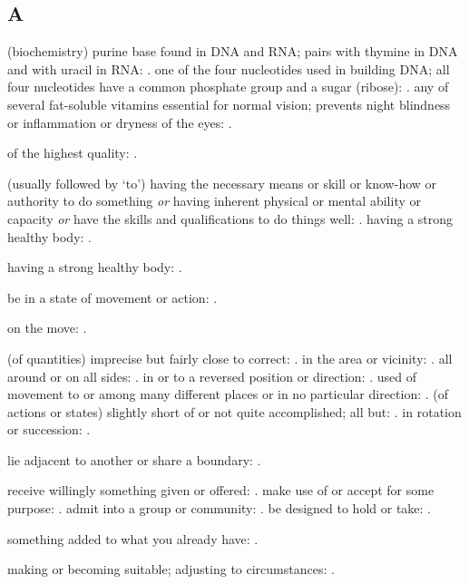 \subsection*{A}

  (biochemistry) purine base found in DNA and RNA; pairs with thymine in DNA and with uracil in RNA: . one of the four nucleotides used in building DNA; all four nucleotides have a common phosphate group and a sugar (ribose): . any of several fat-soluble vitamins essential for normal vision; prevents night blindness or inflammation or dryness of the eyes: .

  of the highest quality: .

  (usually followed by `to') having the necessary means or skill or know-how or authority to do something \textit{or} having inherent physical or mental ability or capacity \textit{or} have the skills and qualifications to do things well: . having a strong healthy body: .

  having a strong healthy body: .

  be in a state of movement or action: .

  on the move: .

  (of quantities) imprecise but fairly close to correct: . in the area or vicinity: . all around or on all sides: . in or to a reversed position or direction: . used of movement to or among many different places or in no particular direction: . (of actions or states) slightly short of or not quite accomplished; all but: . in rotation or succession: .

  lie adjacent to another or share a boundary: .

  receive willingly something given or offered: . make use of or accept for some purpose: . admit into a group or community: . be designed to hold or take: .

  something added to what you already have: .

  making or becoming suitable; adjusting to circumstances: .

